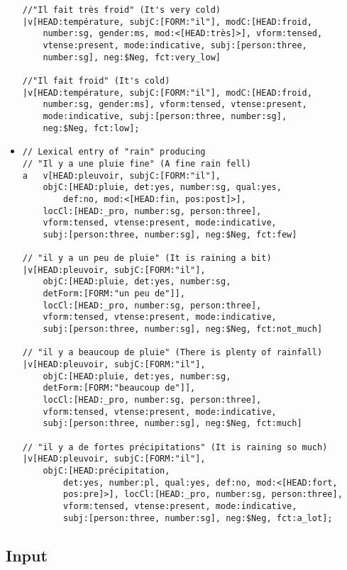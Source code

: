 \documentclass[11pt]{article}
\begin{document}
\begin{itemize}
\begin{verbatim}
//"Il fait très froid" (It's very cold)
|v[HEAD:température, subjC:[FORM:"il"], modC:[HEAD:froid, 
	number:sg, gender:ms, mod:<[HEAD:très]>], vform:tensed,
	vtense:present, mode:indicative, subj:[person:three, 
	number:sg], neg:$Neg, fct:very_low]

//"Il fait froid" (It's cold)
|v[HEAD:température, subjC:[FORM:"il"], modC:[HEAD:froid, 
	number:sg, gender:ms], vform:tensed, vtense:present, 
	mode:indicative, subj:[person:three, number:sg], 
	neg:$Neg, fct:low]; 
\end{verbatim}
	
\bigskip
\item \begin{verbatim}
// Lexical entry of "rain" producing
// "Il y a une pluie fine" (A fine rain fell)
a	v[HEAD:pleuvoir, subjC:[FORM:"il"], 
	objC:[HEAD:pluie, det:yes, number:sg, qual:yes,
		def:no, mod:<[HEAD:fin, pos:post]>], 
	locCl:[HEAD:_pro, number:sg, person:three], 
	vform:tensed, vtense:present, mode:indicative, 
	subj:[person:three, number:sg], neg:$Neg, fct:few]
	
// "il y a un peu de pluie" (It is raining a bit)
|v[HEAD:pleuvoir, subjC:[FORM:"il"], 
	objC:[HEAD:pluie, det:yes, number:sg, 
	detForm:[FORM:"un peu de"]], 
	locCl:[HEAD:_pro, number:sg, person:three], 
	vform:tensed, vtense:present, mode:indicative, 
	subj:[person:three, number:sg], neg:$Neg, fct:not_much]

// "il y a beaucoup de pluie" (There is plenty of rainfall)
|v[HEAD:pleuvoir, subjC:[FORM:"il"], 
	objC:[HEAD:pluie, det:yes, number:sg, 
	detForm:[FORM:"beaucoup de"]], 
	locCl:[HEAD:_pro, number:sg, person:three], 
	vform:tensed, vtense:present, mode:indicative, 
	subj:[person:three, number:sg], neg:$Neg, fct:much]

// "il y a de fortes précipitations" (It is raining so much)
|v[HEAD:pleuvoir, subjC:[FORM:"il"], 
	objC:[HEAD:précipitation,
        det:yes, number:pl, qual:yes, def:no, mod:<[HEAD:fort,
        pos:pre]>], locCl:[HEAD:_pro, number:sg, person:three],
        vform:tensed, vtense:present, mode:indicative,
        subj:[person:three, number:sg], neg:$Neg, fct:a_lot]; 
\end{verbatim}

\end{itemize}

\subsection{Input}
\end{document}
